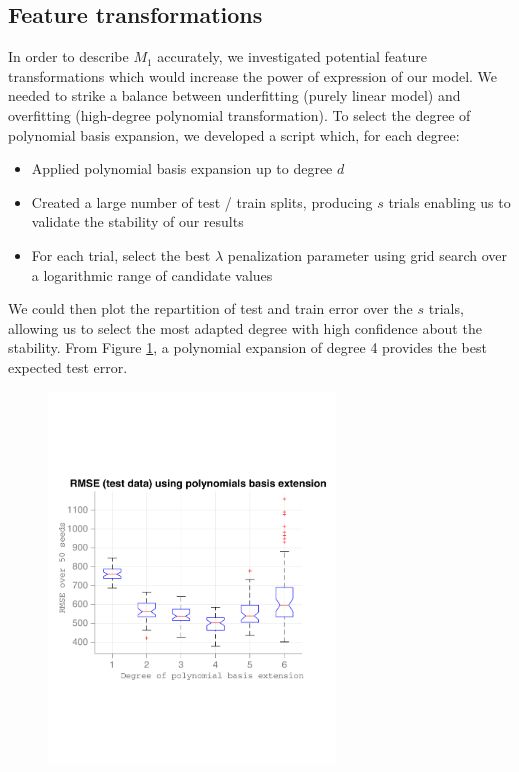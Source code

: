 \documentclass{article} %
\begin{document}
  \subsection{Feature transformations}
  In order to describe $M_1$ accurately, we investigated potential feature transformations which would increase the power of expression of our model. We needed to strike a balance between underfitting (purely linear model) and overfitting (high-degree polynomial transformation). To select the degree of polynomial basis expansion, we developed a script which, for each degree:
  \begin{itemize}
    \item Applied polynomial basis expansion up to degree $d$
    \item Created a large number of test / train splits, producing $s$ trials enabling us to validate the stability of our results
    \item For each trial, select the best $\lambda$ penalization parameter using grid search over a logarithmic range of candidate values
  \end{itemize}

  We could then plot the repartition of test and train error over the $s$ trials, allowing us to select the most adapted degree with high confidence about the stability. From Figure \ref{fig:basisExpansionTestError}, a polynomial expansion of degree 4 provides the best expected test error.

  \begin{figure}[h]
    \center
    \includegraphics[width=3in]{figures/regression/basis-extension-test-error.pdf}
    \caption{}
    \label{fig:basisExpansionTestError}
  \end{figure}
\end{document}
